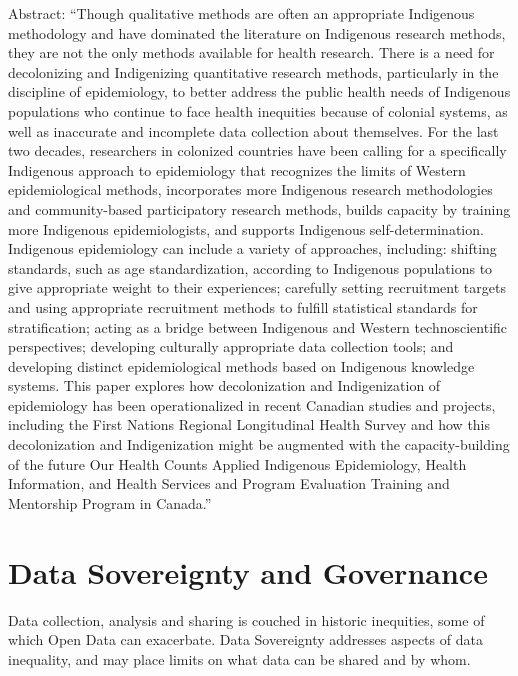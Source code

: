 \documentclass[
]{book}
\begin{document}
Abstract: ``Though qualitative methods are often an appropriate Indigenous methodology and have dominated the literature on Indigenous research methods, they are not the only methods available for health research. There is a need for decolonizing and Indigenizing quantitative research methods, particularly in the discipline of epidemiology, to better address the public health needs of Indigenous populations who continue to face health inequities because of colonial systems, as well as inaccurate and incomplete data collection about themselves. For the last two decades, researchers in colonized countries have been calling for a specifically Indigenous approach to epidemiology that recognizes the limits of Western epidemiological methods, incorporates more Indigenous research methodologies and community-based participatory research methods, builds capacity by training more Indigenous epidemiologists, and supports Indigenous self-determination. Indigenous epidemiology can include a variety of approaches, including: shifting standards, such as age standardization, according to Indigenous populations to give appropriate weight to their experiences; carefully setting recruitment targets and using appropriate recruitment methods to fulfill statistical standards for stratification; acting as a bridge between Indigenous and Western technoscientific perspectives; developing culturally appropriate data collection tools; and developing distinct epidemiological methods based on Indigenous knowledge systems. This paper explores how decolonization and Indigenization of epidemiology has been operationalized in recent Canadian studies and projects, including the First Nations Regional Longitudinal Health Survey and how this decolonization and Indigenization might be augmented with the capacity-building of the future Our Health Counts Applied Indigenous Epidemiology, Health Information, and Health Services and Program Evaluation Training and Mentorship Program in Canada.''

\hypertarget{data-sovereignty-and-governance}{%
\chapter{Data Sovereignty and Governance}\label{data-sovereignty-and-governance}}

Data collection, analysis and sharing is couched in historic inequities, some of which Open Data can exacerbate. Data Sovereignty addresses aspects of data inequality, and may place limits on what data can be shared and by whom.
\end{document}
